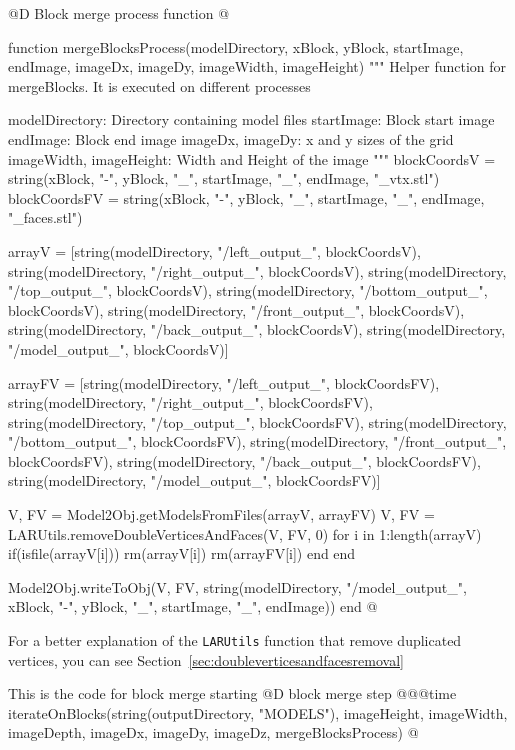 \documentclass[11pt,oneside]{article}	%
\begin{document}
@D Block merge process function
@{function mergeBlocksProcess(modelDirectory,
			      xBlock, yBlock,
			      startImage, endImage,
			      imageDx, imageDy,
			      imageWidth, imageHeight)
  """
  Helper function for mergeBlocks.
  It is executed on different processes

  modelDirectory: Directory containing model files
  startImage: Block start image
  endImage: Block end image
  imageDx, imageDy: x and y sizes of the grid
  imageWidth, imageHeight: Width and Height of the image
  """
  blockCoordsV = string(xBlock, "-", yBlock, "_", startImage,
			"_", endImage, "_vtx.stl")
  blockCoordsFV = string(xBlock, "-", yBlock, "_", startImage,
			"_", endImage, "_faces.stl")

  arrayV = [string(modelDirectory, "/left_output_", blockCoordsV),
	    string(modelDirectory, "/right_output_", blockCoordsV),
	    string(modelDirectory, "/top_output_", blockCoordsV),
	    string(modelDirectory, "/bottom_output_", blockCoordsV),
	    string(modelDirectory, "/front_output_", blockCoordsV),
	    string(modelDirectory, "/back_output_", blockCoordsV),
	    string(modelDirectory, "/model_output_", blockCoordsV)]

  arrayFV = [string(modelDirectory, "/left_output_", blockCoordsFV),
	      string(modelDirectory, "/right_output_", blockCoordsFV),
	      string(modelDirectory, "/top_output_", blockCoordsFV),
	      string(modelDirectory, "/bottom_output_", blockCoordsFV),
	      string(modelDirectory, "/front_output_", blockCoordsFV),
	      string(modelDirectory, "/back_output_", blockCoordsFV),
	      string(modelDirectory, "/model_output_", blockCoordsFV)]

  V, FV = Model2Obj.getModelsFromFiles(arrayV, arrayFV)
  V, FV = LARUtils.removeDoubleVerticesAndFaces(V, FV, 0)
  for i in 1:length(arrayV)
    if(isfile(arrayV[i]))
      rm(arrayV[i])
      rm(arrayFV[i])
    end
  end

  Model2Obj.writeToObj(V, FV, string(modelDirectory, "/model_output_",
			    xBlock, "-", yBlock, "_", startImage, "_", endImage))
end @}

For a better explanation of the \texttt{LARUtils} function that remove duplicated vertices, you can see Section~\ref{sec:doubleverticesandfacesremoval}

This is the code for block merge starting
@D block merge step
@{@@time iterateOnBlocks(string(outputDirectory, "MODELS"),
                  imageHeight, imageWidth, imageDepth,
                  imageDx, imageDy, imageDz,
                  mergeBlocksProcess) @}
\end{document}
